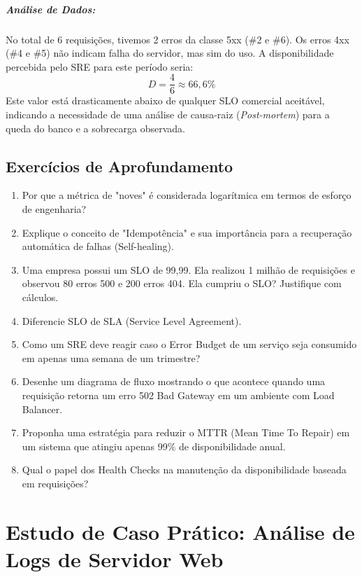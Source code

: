 \documentclass[12pt,a4paper,twoside]{report}
\begin{document}
\paragraph{Análise de Dados:}
No total de 6 requisições, tivemos 2 erros da classe 5xx (\#2 e \#6). Os erros 4xx (\#4 e \#5) não indicam falha do servidor, mas sim do uso.
A disponibilidade percebida pelo SRE para este período seria:
\[ D = \frac{4}{6} \approx 66,6\% \]
Este valor está drasticamente abaixo de qualquer SLO comercial aceitável, indicando a necessidade de uma análise de causa-raiz (\textit{Post-mortem}) para a queda do banco e a sobrecarga observada.

\section{Exercícios de Aprofundamento}

\begin{enumerate}
    \item Por que a métrica de "noves" é considerada logarítmica em termos de esforço de engenharia?
    \item Explique o conceito de "Idempotência" e sua importância para a recuperação automática de falhas (Self-healing).
    \item Uma empresa possui um SLO de 99,99. Ela realizou 1 milhão de requisições e observou 80 erros 500 e 200 erros 404. Ela cumpriu o SLO? Justifique com cálculos.
    \item Diferencie SLO de SLA (Service Level Agreement).
    \item Como um SRE deve reagir caso o Error Budget de um serviço seja consumido em apenas uma semana de um trimestre?
    \item Desenhe um diagrama de fluxo mostrando o que acontece quando uma requisição retorna um erro 502 Bad Gateway em um ambiente com Load Balancer.
    \item Proponha uma estratégia para reduzir o MTTR (Mean Time To Repair) em um sistema que atingiu apenas 99\% de disponibilidade anual.
    \item Qual o papel dos Health Checks na manutenção da disponibilidade baseada em requisições?
\end{enumerate}

\chapter{Estudo de Caso Prático: Análise de Logs de Servidor Web}
\end{document}
